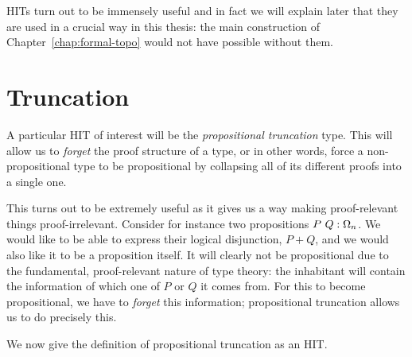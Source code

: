 HITs turn out to be immensely useful and in fact we will explain later that they are used
in a crucial way in this thesis: the main construction of Chapter~\ref{chap:formal-topo}
would not have possible without them.

\section{Truncation}

A particular HIT of interest will be the \emph{propositional truncation} type. This will
allow us to \emph{forget} the proof structure of a type, or in other words, force a
non-propositional type to be propositional by collapsing all of its different proofs into
a single one.

This turns out to be extremely useful as it gives us a way making proof-relevant things
proof-irrelevant. Consider for instance two propositions $P~Q:\Omega_n$. We would
like to be able to express their logical disjunction, $P + Q$, and we would also like it
to be a proposition itself. It will clearly not be propositional due to the fundamental,
proof-relevant nature of type theory: the inhabitant will contain the information of which
one of $P$ or $Q$ it comes from. For this to become propositional, we have to
\emph{forget} this information; propositional truncation allows us to do precisely this.

We now give the definition of propositional truncation as an HIT.

\begin{defn}\label{defn:truncation}
\end{defn}
